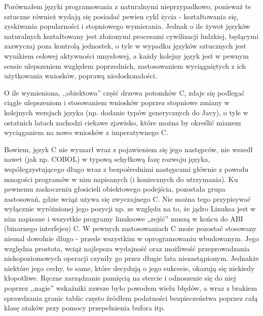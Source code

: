 Porównałem języki programowania z naturalnymi nieprzypadkowo, ponieważ te sztuczne również wydają się posiadać pewien cykl życia - kształtowania się, zyskiwania popularności i stopniowego wymierania. Jednak o ile żywot języków naturalnych kształtowany jest złożonymi procesami cywilizacji ludzkiej, będącymi zazwyczaj poza kontrolą jednostek, o tyle w wypadku języków sztucznych jest wynikiem celowej aktywności umysłowej, a każdy kolejny język jest w pewnym sensie ulepszeniem względem poprzednich, zastosowaniem wyciągniętych z ich użytkowania wniosków, poprawą niedoskonałości\cite{valverde2015}.

O ile wymieniona, ,,obiektowa'' część drzewa potomków C, zdaje się podlegać ciągle ulepszeniom i stosowaniem wniosków poprzez stopniowe zmiany w kolejnych wersjach języka (np. dodanie typów generycznych do Javy), o tyle w ostatnich latach zachodzi ciekawe zjawisko, które można by określić mianem wyciąganiem na nowo wniosków z imperatywnego C.

Bowiem, język C nie wymarł wraz z pojawieniem się jego następców, nie wszedł nawet (jak np. COBOL) w typową schyłkową fazę rozwoju języka, współegzystującego długo wraz z bezpośrednimi następcami głównie z powodu mnogości programów w nim napisanych (i koniecznych do utrzymania). Ku pewnemu zaskoczeniu głosicieli obiektowego podejścia, pozostała grupa zastosowań, gdzie wciąż używa się zwyczajnego C. Nie można tego przypisywać wyłącznie wyróżnionej jego pozycji np. ze względu na to, że jądro Linuksa jest w nim napisane i wszystkie programy linuksowe „zejść” muszą w końcu do ABI (binarnego interfejsu) C. W pewnych zastosowaniach C może pozostać stosowany niemal dowolnie długo - przede wszystkim w oprogramowaniu wbudowanym. Jego względna prostota, wciąż najlepsza wydajność oraz możliwość przeprowadzania niskopoziomowych operacji czyniły go przez długie lata niezastąpionym. Jednakże niektóre jego cechy, te same, które decydują o jego sukcesie, okazują się niekiedy kłopotliwe. Ręczne zarządzanie pamięcią na stercie i odnoszenie się do niej poprzez ,,nagie'' wskaźniki zawsze było powodem wielu błędów, a wraz z brakiem sprawdzania granic tablic często źródłem podatności bezpieczeństwa poprzez całą klasę ataków przy pomocy przepełnienia bufora itp. 


